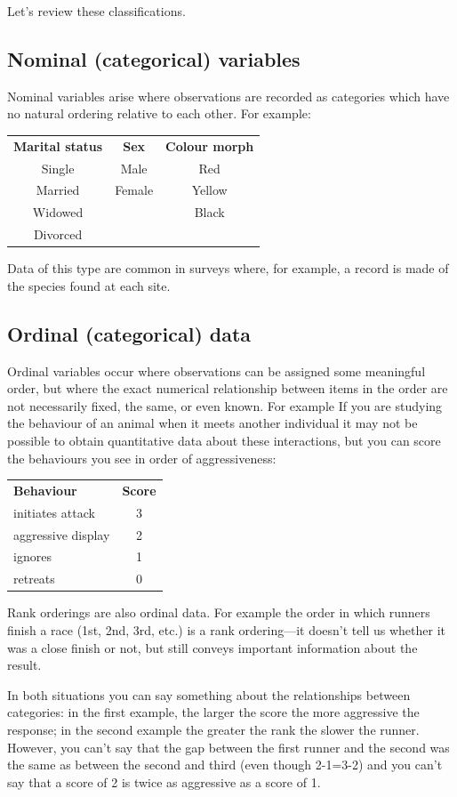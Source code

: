 \documentclass[]{book}
\begin{document}
Let's review these classifications.

\subsection{Nominal (categorical)
variables}\label{nominal-categorical-variables}

Nominal variables arise where observations are recorded as categories
which have no natural ordering relative to each other. For example:

\begin{longtable}[]{@{}ccc@{}}
\toprule
\textbf{Marital status} & \textbf{Sex} & \textbf{Colour
morph}\tabularnewline
Single & Male & Red\tabularnewline
Married & Female & Yellow\tabularnewline
Widowed & & Black\tabularnewline
Divorced & &\tabularnewline
\bottomrule
\end{longtable}

Data of this type are common in surveys where, for example, a record is
made of the species found at each site.

\subsection{Ordinal (categorical) data}\label{ordinal-categorical-data}

Ordinal variables occur where observations can be assigned some
meaningful order, but where the exact numerical relationship between
items in the order are not necessarily fixed, the same, or even known.
For example If you are studying the behaviour of an animal when it meets
another individual it may not be possible to obtain quantitative data
about these interactions, but you can score the behaviours you see in
order of aggressiveness:

\begin{longtable}[]{@{}lc@{}}
\toprule
\textbf{Behaviour} & \textbf{Score}\tabularnewline
initiates attack & 3\tabularnewline
aggressive display & 2\tabularnewline
ignores & 1\tabularnewline
retreats & 0\tabularnewline
\bottomrule
\end{longtable}

Rank orderings are also ordinal data. For example the order in which
runners finish a race (1st, 2nd, 3rd, etc.) is a rank ordering---it
doesn't tell us whether it was a close finish or not, but still conveys
important information about the result.

In both situations you can say something about the relationships between
categories: in the first example, the larger the score the more
aggressive the response; in the second example the greater the rank the
slower the runner. However, you can't say that the gap between the first
runner and the second was the same as between the second and third (even
though 2-1=3-2) and you can't say that a score of 2 is twice as
aggressive as a score of 1.
\end{document}

